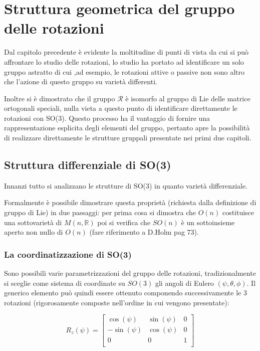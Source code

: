 \documentclass[11pt]{report}
\theoremstyle{plain}
\theoremstyle{definition}
\theoremstyle{remark}
\begin{document}
\clearpage
\chapter{Struttura geometrica del gruppo delle rotazioni}
Dal capitolo precedente è evidente la moltitudine di punti di vista da cui si può affrontare lo studio delle rotazioni, lo studio ha portato ad identificare un solo gruppo astratto di cui ,ad esempio, le rotazioni attive o passive non sono altro che l'azione di questo gruppo su varietà differenti.

Inoltre si è dimostrato che il gruppo $\mathscr{R}$ è isomorfo al gruppo di Lie delle matrice ortogonali speciali, nulla vieta a questo punto di identificare direttamente le rotazioni con SO(3). Questo processo ha il vantaggio di fornire una rappresentazione esplicita degli elementi del gruppo, pertanto apre la possibilità di realizzare direttamente le strutture gruppali presentate nei primi due capitoli.

\section{Struttura differenziale di SO(3)}
Innanzi tutto si analizzano le strutture di SO(3) in quanto varietà differenziale. 

Formalmente è possibile dimostrare questa proprietà (richiesta dalla definizione di gruppo di Lie) in due passaggi: per prima cosa si dimostra che $O(n)$ costituisce una sottovarietà di $M(n,\mathbb{R})$ poi si verifica che $SO(n)$ è un sottoinsieme aperto non nullo di $O(n)$ (fare riferimento a D.Holm pag 73).
  
\subsection{La coordinatizzazione di SO(3)}
Sono possibili varie parametrizzazioni del gruppo delle rotazioni, tradizionalmente si sceglie come sistema di coordinate su $SO(3)$ gli angoli di Eulero $(\psi, \theta, \phi)$.
Il generico elemento può quindi essere ottenuto componendo successivamente le 3 rotazioni (rigorosamente composte nell'ordine in cui vengono presentate):

\begin{displaymath}
R_{z}(\psi) = \left[ \begin{array}{ccc}
\cos(\psi) & \sin(\psi) & 0  \\
-\sin(\psi) & \cos(\psi) & 0  \\
0 & 0 & 1 \\
\end{array} \right]
\end{displaymath}	
\end{document}
